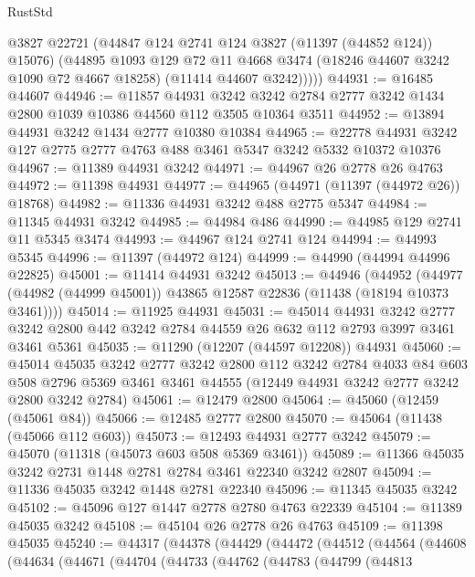 \begin{lexlean}{RustStd}
\begin{coremodule}
          @3827
          @22721
          (@44847 @124 @2741 @124 @3827 (@11397 (@44852 @124)) @15076)
          (@44895
            @1093
            @129
            @72
            @11
            @4668
            @3474
            (@18246 @44607 @3242 @1090 @72 @4667 @18258)
            (@11414 @44607 @3242)))))
@44931 := @16485 @44607
@44946 := @11857
    @44931
    @3242
    @3242
    @2784
    @2777
    @3242
    @1434
    @2800
    @1039
    @10386
    @44560
    @112
    @3505
    @10364
    @3511
@44952 := @13894 @44931 @3242 @1434 @2777 @10380 @10384
@44965 := @22778 @44931 @3242 @127 @2775 @2777 @4763 @488 @3461 @5347 @3242 @5332 @10372 @10376
@44967 := @11389 @44931 @3242
@44971 := @44967 @26 @2778 @26 @4763
@44972 := @11398 @44931
@44977 := @44965 (@44971 (@11397 (@44972 @26)) @18768)
@44982 := @11336 @44931 @3242 @488 @2775 @5347
@44984 := @11345 @44931 @3242
@44985 := @44984 @486
@44990 := @44985 @129 @2741 @11 @5345 @3474
@44993 := @44967 @124 @2741 @124
@44994 := @44993 @5345
@44996 := @11397 (@44972 @124)
@44999 := @44990 (@44994 @44996 @22825)
@45001 := @11414 @44931 @3242
@45013 := @44946
    (@44952 (@44977 (@44982 (@44999 @45001)) @43865 @12587 @22836 (@11438 (@18194 @10373 @3461))))
@45014 := @11925 @44931
@45031 := @45014
    @44931
    @3242
    @2777
    @3242
    @2800
    @442
    @3242
    @2784
    @44559
    @26
    @632
    @112
    @2793
    @3997
    @3461
    @3461
    @5361
@45035 := @11290 (@12207 (@44597 @12208)) @44931
@45060 := @45014
    @45035
    @3242
    @2777
    @3242
    @2800
    @112
    @3242
    @2784
    @4033
    @84
    @603
    @508
    @2796
    @5369
    @3461
    @3461
    @44555
    (@12449 @44931 @3242 @2777 @3242 @2800 @3242 @2784)
@45061 := @12479 @2800
@45064 := @45060 (@12459 (@45061 @84))
@45066 := @12485 @2777 @2800
@45070 := @45064 (@11438 (@45066 @112 @603))
@45073 := @12493 @44931 @2777 @3242
@45079 := @45070 (@11318 (@45073 @603 @508 @5369 @3461))
@45089 := @11366 @45035 @3242 @2731 @1448 @2781 @2784 @3461 @22340 @3242 @2807
@45094 := @11336 @45035 @3242 @1448 @2781 @22340
@45096 := @11345 @45035 @3242
@45102 := @45096 @127 @1447 @2778 @2780 @4763 @22339
@45104 := @11389 @45035 @3242
@45108 := @45104 @26 @2778 @26 @4763
@45109 := @11398 @45035
@45240 := @44317
    (@44378
      (@44429
        (@44472
          (@44512
            (@44564
              (@44608
                (@44634
                  (@44671
                    (@44704
                      (@44733
                        (@44762
                          (@44783
                            (@44799
                              (@44813

\end{coremodule}
\end{lexlean}

